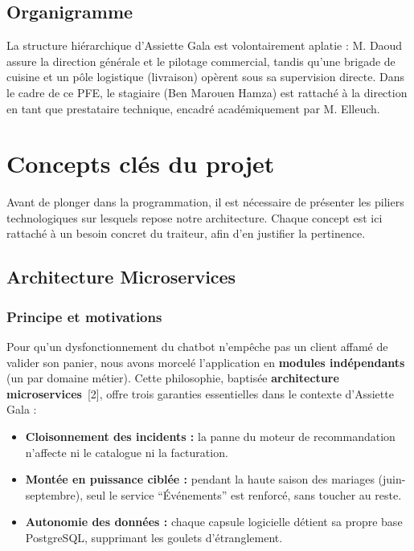 \subsection{Organigramme}

La structure hiérarchique d'Assiette Gala est volontairement aplatie : M. Daoud assure la direction générale et le pilotage commercial, tandis qu'une brigade de cuisine et un pôle logistique (livraison) opèrent sous sa supervision directe. Dans le cadre de ce PFE, le stagiaire (Ben Marouen Hamza) est rattaché à la direction en tant que prestataire technique, encadré académiquement par M. Elleuch.

\section{Concepts clés du projet}

Avant de plonger dans la programmation, il est nécessaire de présenter les piliers technologiques sur lesquels repose notre architecture. Chaque concept est ici rattaché à un besoin concret du traiteur, afin d'en justifier la pertinence.

\subsection{Architecture Microservices}

\subsubsection{Principe et motivations}

Pour qu'un dysfonctionnement du chatbot n'empêche pas un client affamé de valider son panier, nous avons morcelé l'application en \textbf{modules indépendants} (un par domaine métier). Cette philosophie, baptisée \textbf{architecture microservices}~[2], offre trois garanties essentielles dans le contexte d'Assiette Gala :

\begin{itemize}
    \item \textbf{Cloisonnement des incidents :} la panne du moteur de recommandation n'affecte ni le catalogue ni la facturation.
    \item \textbf{Montée en puissance ciblée :} pendant la haute saison des mariages (juin-septembre), seul le service ``Événements'' est renforcé, sans toucher au reste.
    \item \textbf{Autonomie des données :} chaque capsule logicielle détient sa propre base PostgreSQL, supprimant les goulets d'étranglement.
\end{itemize}

